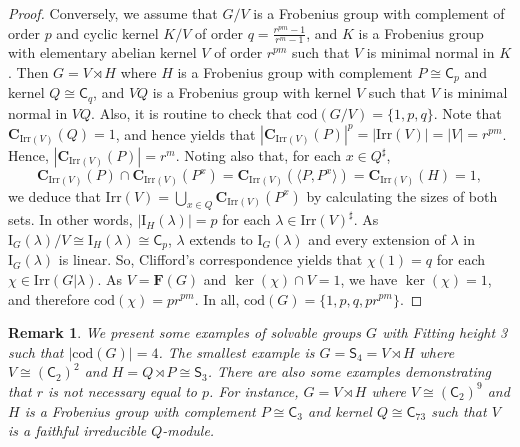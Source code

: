 \documentclass[9pt]{article}
\newtheorem{rmk}[lem]{\bf Remark}
\begin{document}
\begin{proof}
Conversely, we assume that $G/V$ is a Frobenius group with complement of order $p$ and cyclic kernel $K/V$
	of order $q=\frac{r^{pm}-1}{r^m-1}$,
	and $K$ is a Frobenius group with elementary abelian kernel $V$ of order $r^{pm}$ such that $V$ is minimal normal in $K$.
	Then $G=V \rtimes H$ where $H$ is a Frobenius group with complement $P\cong \mathsf{C}_{p}$ and kernel $Q\cong \mathsf{C}_{q}$, and $VQ$ is a Frobenius group with kernel $V$ such that $V$ is minimal normal in $VQ$.
	Also, it is routine to check that 
    $\mathrm{cod}(G/V)=\{ 1,p,q \}$.
	Note that $\mathbf{C}_{\mathrm{Irr}(V)}(Q)=1$,
	and hence \cite[Theorem 15.16]{isaacs1994} yields that 
    $|\mathbf{C}_{\mathrm{Irr}(V)}(P)|^{p}=|\mathrm{Irr}(V)|=|V|=r^{pm}$.
	Hence, $|\mathbf{C}_{\mathrm{Irr}(V)}(P)|=r^{m}$.
	Noting also that, for each $x\in Q^\sharp$, 
	$$\mathbf{C}_{\mathrm{Irr}(V)}(P)\cap \mathbf{C}_{\mathrm{Irr}(V)}(P^x)=\mathbf{C}_{\mathrm{Irr}(V)}(\langle P,P^x\rangle)=\mathbf{C}_{\mathrm{Irr}(V)}(H)=1,$$ 
    we deduce that $\mathrm{Irr}(V)=\bigcup_{x\in Q} \mathbf{C}_{\mathrm{Irr}(V)}(P^{x})$ by calculating the sizes of both sets.
    In other words, $|\mathrm{I}_{H}(\lambda)|=p$ for each $\lambda\in \mathrm{Irr}(V)^\sharp$.
    As $\mathrm{I}_{G}(\lambda)/V\cong \mathrm{I}_{H}(\lambda)\cong \mathsf{C}_{p}$,
	$\lambda$ extends to $\mathrm{I}_{G}(\lambda)$ and every extension of $\lambda$ in $\mathrm{I}_{G}(\lambda)$ is linear.
	So, Clifford's correspondence yields that $\chi(1)=q$ for each $\chi\in\mathrm{Irr}(G|\lambda)$.
	As $V=\mathbf{F}(G)$ and $\ker(\chi)\cap V=1$,
	we have $\ker(\chi)=1$, and
	therefore $\mathrm{cod}(\chi)=pr^{pm}$. 
    In all, $\mathrm{cod}(G)=\{ 1,p,q,pr^{pm} \}$.
\end{proof}



\begin{rmk}
  {\rm    We present some examples of solvable groups $G$ with Fitting height 3 such that 
	$|\mathrm{cod}(G)|=4$.
	The smallest example is $G=\mathsf{S}_{4}=V \rtimes H$ where $V\cong (\mathsf{C}_{2})^{2}$ and $H=Q \rtimes P\cong \mathsf{S}_{3}$.
    There are also some examples demonstrating that $r$ is not necessary equal to $p$.
	For instance, 
	$G=V \rtimes H$ where $V\cong (\mathsf{C}_{2})^{9}$ and $H$ is a Frobenius group with complement $P\cong \mathsf{C}_{3}$ and kernel $Q\cong \mathsf{C}_{73}$ such that $V$ is a faithful irreducible $Q$-module. }
\end{rmk}
\end{document}
